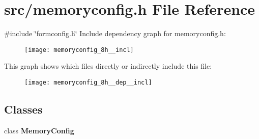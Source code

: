 \section{src/memoryconfig.h File Reference}
\label{memoryconfig_8h}
{\ttfamily \#include \char`\"{}formconfig.\+h\char`\"{}}\newline
Include dependency graph for memoryconfig.\+h\+:\nopagebreak
\begin{figure}[H]
\begin{center}
\leavevmode
\texttt{[image: memoryconfig\_8h\_\_incl]}
\end{center}
\end{figure}
This graph shows which files directly or indirectly include this file\+:\nopagebreak
\begin{figure}[H]
\begin{center}
\leavevmode
\texttt{[image: memoryconfig\_8h\_\_dep\_\_incl]}
\end{center}
\end{figure}
\subsection*{Classes}
\begin{DoxyCompactItemize}
\item 
class \textbf{ Memory\+Config}
\end{DoxyCompactItemize}
